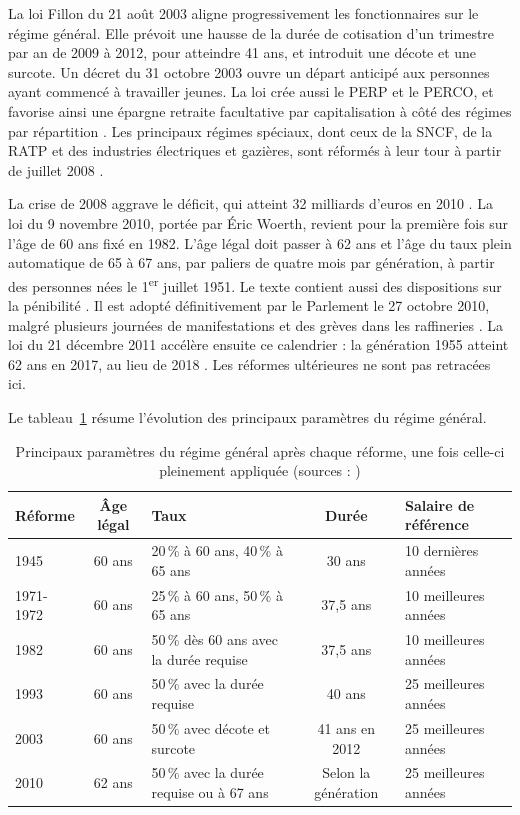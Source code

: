 La loi Fillon du 21 août 2003 aligne progressivement les fonctionnaires sur le régime général. Elle prévoit une hausse de la durée de cotisation d'un trimestre par an de 2009 à 2012, pour atteindre 41 ans, et introduit une décote et une surcote. Un décret du 31 octobre 2003 ouvre un départ anticipé aux personnes ayant commencé à travailler jeunes. La loi crée aussi le PERP et le PERCO, et favorise ainsi une épargne retraite facultative par capitalisation à côté des régimes par répartition \cite{fabas2023}. Les principaux régimes spéciaux, dont ceux de la SNCF, de la RATP et des industries électriques et gazières, sont réformés à leur tour à partir de juillet 2008 \cite{fabas2023}.

La crise de 2008 aggrave le déficit, qui atteint 32 milliards d'euros en 2010 \cite{retraiteenclair}. La loi du 9 novembre 2010, portée par Éric Woerth, revient pour la première fois sur l'âge de 60 ans fixé en 1982. L'âge légal doit passer à 62 ans et l'âge du taux plein automatique de 65 à 67 ans, par paliers de quatre mois par génération, à partir des personnes nées le 1\textsuperscript{er} juillet 1951. Le texte contient aussi des dispositions sur la pénibilité \cite{fabas2023}. Il est adopté définitivement par le Parlement le 27 octobre 2010, malgré plusieurs journées de manifestations et des grèves dans les raffineries \cite{universalis2010}. La loi du 21 décembre 2011 accélère ensuite ce calendrier : la génération 1955 atteint 62 ans en 2017, au lieu de 2018 \cite{fabas2023}. Les réformes ultérieures ne sont pas retracées ici.

Le tableau~\ref{tab:parametres_retraite} résume l'évolution des principaux paramètres du régime général.

\begin{table}[H]
    \centering
    \small
    \renewcommand{\arraystretch}{1.3}
    \begin{tabularx}{\textwidth}{@{}lcXcX@{}}
        \toprule
        \textbf{Réforme} & \textbf{Âge légal} & \textbf{Taux} & \textbf{Durée} & \textbf{Salaire de référence} \\
        \midrule
        1945 & 60 ans & 20\,\% à 60 ans, 40\,\% à 65 ans & 30 ans & 10 dernières années \\
        1971-1972 & 60 ans & 25\,\% à 60 ans, 50\,\% à 65 ans & 37,5 ans & 10 meilleures années \\
        1982 & 60 ans & 50\,\% dès 60 ans avec la durée requise & 37,5 ans & 10 meilleures années \\
        1993 & 60 ans & 50\,\% avec la durée requise & 40 ans & 25 meilleures années \\
        2003 & 60 ans & 50\,\% avec décote et surcote & 41 ans en 2012 & 25 meilleures années \\
        2010 & 62 ans & 50\,\% avec la durée requise ou à 67 ans & Selon la génération & 25 meilleures années \\
        \bottomrule
    \end{tabularx}
    \caption{Principaux paramètres du régime général après chaque réforme, une fois celle-ci pleinement appliquée (sources : \cite{cfdt,fabas2023})}
    \label{tab:parametres_retraite}
\end{table}

